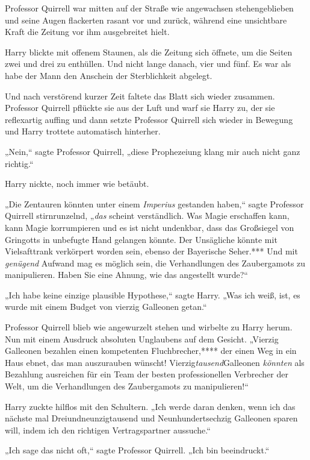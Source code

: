 {Professor Quirrell war mitten auf der Straße wie angewachsen stehengeblieben und seine Augen flackerten rasant vor und zurück, während eine unsichtbare Kraft die Zeitung vor ihm ausgebreitet hielt.

Harry blickte mit offenem Staunen, als die Zeitung sich öffnete, um die Seiten zwei und drei zu enthüllen. Und nicht lange danach, vier und fünf. Es war als habe der Mann den Anschein der Sterblichkeit abgelegt.

Und nach verstörend kurzer Zeit faltete das Blatt sich wieder zusammen. Professor Quirrell pflückte sie aus der Luft und warf sie Harry zu, der sie reflexartig auffing und dann setzte Professor Quirrell sich wieder in Bewegung und Harry trottete automatisch hinterher.

„Nein,“ sagte Professor Quirrell, „diese Prophezeiung klang mir auch nicht ganz richtig.“

Harry nickte, noch immer wie betäubt.

„Die Zentauren könnten unter einem \emph{Imperius} gestanden haben,“ sagte Professor Quirrell stirnrunzelnd, „\emph{das} scheint verständlich. Was Magie erschaffen kann, kann Magie korrumpieren und es ist nicht undenkbar, dass das Großsiegel von Gringotts in unbefugte Hand gelangen könnte. Der Unsägliche könnte mit Vielsafttrank verkörpert worden sein, ebenso der Bayerische Seher.*** Und mit \emph{genügend} Aufwand mag es möglich sein, die Verhandlungen des Zaubergamots zu manipulieren. Haben Sie eine Ahnung, wie das angestellt wurde?“

„Ich habe keine einzige plausible Hypothese,“ sagte Harry. „Was ich weiß, ist, es wurde mit einem Budget von vierzig Galleonen getan.“

Professor Quirrell blieb wie angewurzelt stehen und wirbelte zu Harry herum. Nun mit einem Ausdruck absoluten Unglaubens auf dem Gesicht. „Vierzig Galleonen bezahlen einen kompetenten Fluchbrecher,**** der einen Weg in ein Haus ebnet, das man auszurauben wünscht! Vierzig\emph{tausend}Galleonen \emph{könnten} als Bezahlung ausreichen für ein Team der besten professionellen Verbrecher der Welt, um die Verhandlungen des Zaubergamots zu manipulieren!“

Harry zuckte hilflos mit den Schultern. „Ich werde daran denken, wenn ich das nächste mal Dreiundneunzigtausend und Neunhundertsechzig Galleonen sparen will, indem ich den richtigen Vertragspartner aussuche.“

„Ich sage das nicht oft,“ sagte Professor Quirrell. „Ich bin beeindruckt.“

}

